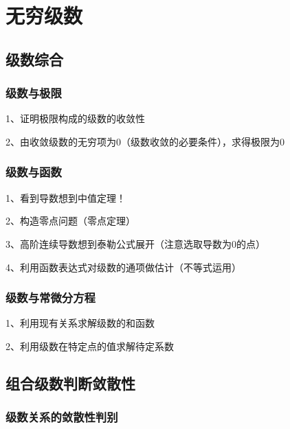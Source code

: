\chapter{无穷级数}

\section{级数综合}



\subsection{级数与极限}

1、证明极限构成的级数的收敛性

2、由收敛级数的无穷项为0（级数收敛的必要条件），求得极限为0



\subsection{级数与函数}

1、看到导数想到中值定理！

2、构造零点问题（零点定理）

3、高阶连续导数想到泰勒公式展开（注意选取导数为0的点）

4、利用函数表达式对级数的通项做估计（不等式运用）



\subsection{级数与常微分方程}

1、利用现有关系求解级数的和函数

2、利用级数在特定点的值求解待定系数

\section{组合级数判断敛散性}



\subsection{级数关系的敛散性判别}

